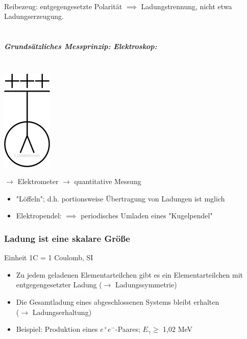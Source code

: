 \documentclass[11pt]{article}
\begin{document}
			\linebreak\\
			Reibezeug: entgegengesetzte Polarit\"{a}t
			$\implies$ Ladungstrennung, nicht etwa Ladungserzeugung.
			\linebreak\\
			\newpage\\
			\subparagraph {Grunds\"{a}tzliches Messprinzip: Elektroskop:} \hfill \\
			
			\includegraphics{skizzen/14/14_1B1}
			
			$\rightarrow$ Elektrometer $\rightarrow$ quantitative Messung
			\begin{itemize}
				\item "L\"{o}ffeln"; d.h. portionsweise Übertragung von Ladungen ist mglich
				\item Elektropendel: $\implies$ periodisches Umladen eines "Kugelpendel"
			\end{itemize}
			
			\subsubsection{Ladung ist eine skalare Gr\"{o}\ss{}e } Einheit 1C = 1 Coulomb, SI
				\begin{itemize}
					\item Zu jedem geladenen Elementarteilchen gibt es ein Elementarteilchen mit entgegengesetzter Ladung ($\rightarrow$ Ladungssymmetrie)
					\item Die Gesamtladung eines abgeschlossenen Systems bleibt erhalten \\
					($\rightarrow$ Ladungserhaltung)
					\item Beispiel: Produktion eines $ e^+e^- $-Paares; $ E_\gamma \geq $ 1,02 MeV
				\end{itemize}
				
\end{document}
